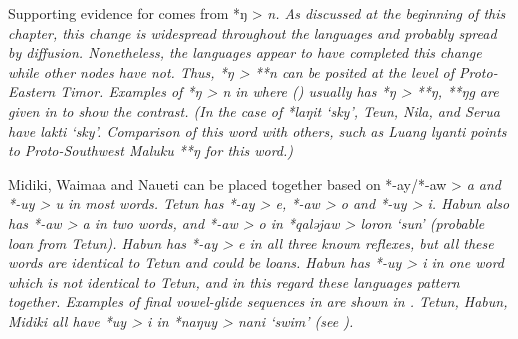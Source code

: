 \newpage
Supporting evidence for  comes from *ŋ > \it{n}.
As discussed at the beginning of this chapter,
this change is widespread throughout the  languages
and probably spread by diffusion.
Nonetheless, the  languages appear to have
completed this change while other nodes have not.
Thus, *ŋ > **n can be posited at the level of Proto-Eastern Timor.
 Examples of *ŋ > \it{n} in  where 
() usually has *ŋ > **ŋ,
**ŋg are given in  to show the contrast.
(In the case of *laŋit ‘sky’,
Teun, Nila, and Serua have \it{lakti} ‘sky’.
Comparison of this word with others, such as Luang \it{lyanti}
points to Proto-Southwest Maluku **ŋ for this word.) 

Midiki, Waima{\Q}a and Naueti can be placed together based on
*-ay/*-aw > \it{a} and *-uy > \it{u} in most words.
Tetun has *-ay > \it{e},
*-aw > \it{o} and *-uy > \it{i}.
Habun also has *-aw > \it{a} in two words,
and *-aw > \it{o} in *qaləjaw > \it{loron} ‘sun’ (probable loan from Tetun).
Habun has *-ay > \it{e} in all three known reflexes,
but all these words are identical to Tetun
and could be loans.
Habun has *-uy > \it{i} in one word which is not identical to
Tetun, and in this regard these languages pattern together.
Examples of final vowel-glide sequences in 
are shown in .
Tetun, Habun, Midiki all have *uy > \it{i} in *naŋuy > \it{nani}
‘swim’ (see ).

